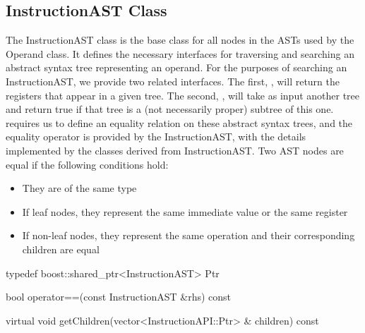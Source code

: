 \subsection{InstructionAST Class}
\label{sec:instructionAST}

The InstructionAST class is the base class for all nodes in the ASTs used by the
Operand class. It defines the necessary interfaces for traversing and searching
an abstract syntax tree representing an operand. For the purposes of searching
an InstructionAST, we provide two related interfaces. The first, ,
will return the registers that appear in a given tree. The second,
, will take as input another tree and return true if that tree is a
(not necessarily proper) subtree of this one.  requires us to
define an equality relation on these abstract syntax trees, and the equality
operator is provided by the InstructionAST, with the details implemented by the
classes derived from InstructionAST. Two AST nodes are equal if the following
conditions hold:

\begin{itemize}
\item They are of the same type
\item If leaf nodes, they represent the same immediate value or the same register
\item If non-\/leaf nodes, they represent the same operation and their corresponding children are equal 
\end{itemize}

\begin{apient}
typedef boost::shared_ptr<InstructionAST> Ptr
\end{apient}
\begin{apient}
bool operator==(const InstructionAST &rhs) const  
\end{apient}

\begin{apient}
virtual void getChildren(vector<InstructionAPI::Ptr> & children) const
\end{apient}


